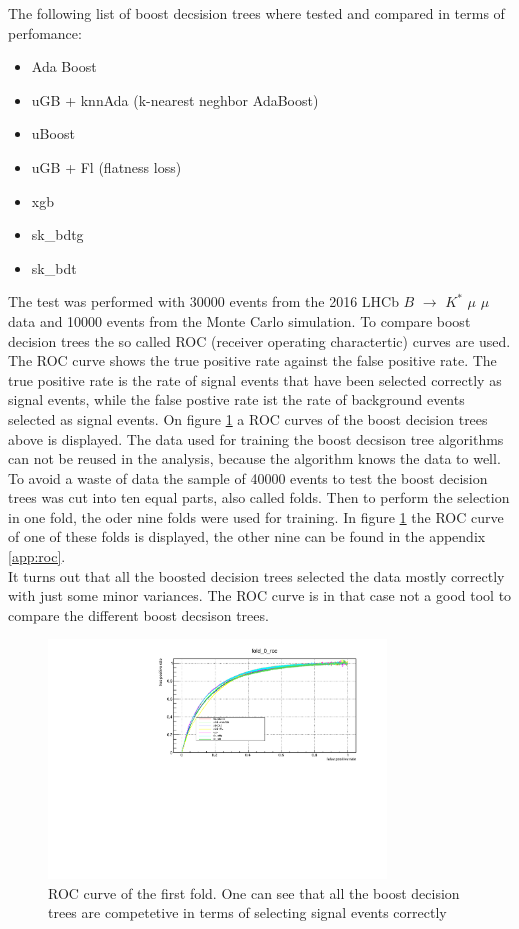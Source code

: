 \documentclass[english]{uzhpub}
\begin{document}
 The following list of boost decsision trees where tested and compared in terms of perfomance:
 \begin{itemize}
  \item Ada Boost \cite{bib:AdaBoost}
  \item uGB \cite{bib:ugb} + knnAda (k-nearest neghbor AdaBoost)
  \item uBoost \cite{bib:uBoost}
  \item uGB \cite{bib:ugb} + Fl (flatness loss)
  \item xgb \cite{bib:xgb}
  \item sk\_bdtg \cite{bib:bdtg}
  \item sk\_bdt \cite{bib:bdt}
 \end{itemize}
 The test was performed with 30000 events from the 2016 LHCb $B$ $\rightarrow$ $K^{*}$ $\mu$ $\mu$ data and 10000 events from the Monte Carlo simulation.
To compare boost decision trees the so called ROC (receiver operating charactertic) curves are used. The ROC curve shows the true positive rate against the false positive rate. The true positive rate is the rate of signal events that have been selected correctly as signal events, while the false postive rate ist the rate of background events selected as signal events. On figure \ref{fig:roc} a ROC curves of the boost decision trees above is displayed.
The data used for training the boost decsison tree algorithms can not be reused in the analysis, because the algorithm knows the data to well. To avoid a waste of data the sample of 40000 events to test the boost decision trees was cut into ten equal parts, also called folds. Then to perform the selection in one fold, the oder nine folds were used for training. In figure \ref{fig:roc} the ROC curve of one of these folds is displayed, the other nine can be found in the appendix \ref{app:roc}. \\
 It turns out that all the boosted decision trees selected the data mostly correctly with just some minor variances. The ROC curve is in that case not a good tool to compare the different boost decsison trees.
 \begin{figure}[H]
  \centering
  \includegraphics[width=0.8\textwidth]{roc/fold_0_roc.pdf}
  \caption{ROC curve of the first fold. One can see that all the boost decision trees are competetive in terms of selecting signal events correctly}
  \label{fig:roc}
 \end{figure}
\end{document}
